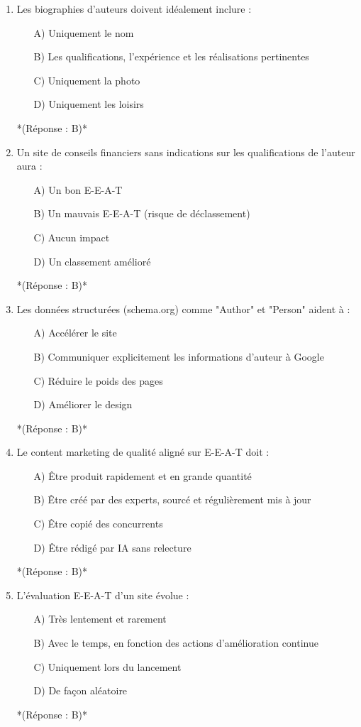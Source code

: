 \documentclass[12pt,a4paper,twoside]{report}
\begin{document}
\begin{enumerate}
\item Les biographies d'auteurs doivent idéalement inclure :
\begin{itemize}
\item[A)] Uniquement le nom
\item[B)] Les qualifications, l'expérience et les réalisations pertinentes
\item[C)] Uniquement la photo
\item[D)] Uniquement les loisirs
\end{itemize}
*(Réponse : B)*

\item Un site de conseils financiers sans indications sur les qualifications de l'auteur aura :
\begin{itemize}
\item[A)] Un bon E-E-A-T
\item[B)] Un mauvais E-E-A-T (risque de déclassement)
\item[C)] Aucun impact
\item[D)] Un classement amélioré
\end{itemize}
*(Réponse : B)*

\item Les données structurées (schema.org) comme "Author" et "Person" aident à :
\begin{itemize}
\item[A)] Accélérer le site
\item[B)] Communiquer explicitement les informations d'auteur à Google
\item[C)] Réduire le poids des pages
\item[D)] Améliorer le design
\end{itemize}
*(Réponse : B)*

\item Le content marketing de qualité aligné sur E-E-A-T doit :
\begin{itemize}
\item[A)] Être produit rapidement et en grande quantité
\item[B)] Être créé par des experts, sourcé et régulièrement mis à jour
\item[C)] Être copié des concurrents
\item[D)] Être rédigé par IA sans relecture
\end{itemize}
*(Réponse : B)*

\item L'évaluation E-E-A-T d'un site évolue :
\begin{itemize}
\item[A)] Très lentement et rarement
\item[B)] Avec le temps, en fonction des actions d'amélioration continue
\item[C)] Uniquement lors du lancement
\item[D)] De façon aléatoire
\end{itemize}
*(Réponse : B)*

\end{enumerate}
\end{document}
